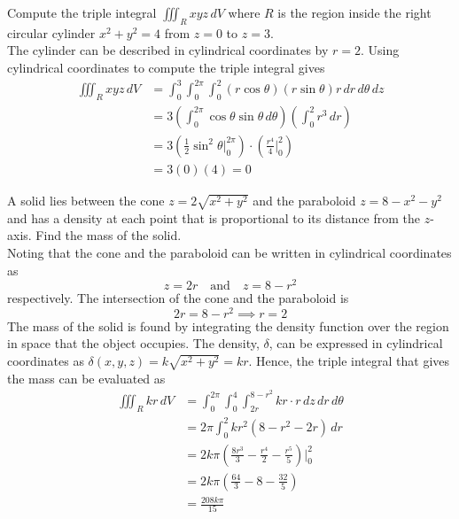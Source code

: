 \documentclass[handout]{ximera}
\begin{document}
\begin{example}[Example 2]
Compute the triple integral $\iiint_R xyz \, dV$ where $R$ is the region inside the right circular cylinder $ x^2 + y^2 = 4$ from $z = 0 $ to $z = 3$.\\
The cylinder can be described in cylindrical coordinates by $r = 2$. Using cylindrical coordinates to compute the triple integral gives
\begin{align*}
\iiint_R xyz \, dV &= \int_0^3 \int_0^{2\pi} \int_0^2 (r\cos \theta)(r\sin\theta) r \, dr\, d\theta\, dz \\
                   &= 3 \left( \int_0^{2\pi} \cos \theta \sin \theta \, d\theta\right) \left( \int_0^2 r^3 \, dr\right)\\
                   &= 3 \left(\frac12 \sin^2 \theta \bigg|_0^{2\pi} \right) \cdot \left( \frac{r^4}{4} \bigg|_0^2 \right)\\
                   &= 3 (0) (4) = 0
\end{align*}
\end{example}


\begin{example}[Example 3]
A solid lies between the cone $z = 2\sqrt{x^2 + y^2}$ and the paraboloid $z = 8 - x^2 - y^2$ and has a 
density at each point that is proportional to its distance from the $z$-axis. Find the mass of the solid.\\

Noting that the cone and the paraboloid can be written in cylindrical coordinates as
\[
 z = 2r \quad \text{and} \quad  z = 8 - r^2
\]
respectively. The intersection of the cone and the paraboloid is
\[
2r = 8 - r^2 \implies r = 2
\]
The mass of the solid is found by integrating the density function over the region in space that the object occupies.
The density, $\delta$, can be expressed in cylindrical coordinates as $\delta(x, y, z) = k \sqrt{x^2+y^2} = kr$.
Hence, the triple integral that gives the mass can be evaluated as
\begin{align*}
\iiint_R kr \, dV &=  \int_0^{2\pi} \int_0^4 \int_{2r}^{8-r^2} kr \cdot r \, dz \, dr \, d\theta \\
                  &= 2\pi \int_0^2 kr^2 (8 - r^2 - 2r) \,dr\\
                  &= 2k\pi \left(\frac{8r^3}{3} - \frac{r^4}{2} - \frac{r^5}{5} \right)\bigg|_0^2 \\
                  &= 2k\pi \left(\frac{64}{3} - 8 - \frac{32}{5}\right)\\
                  &= \frac{208k\pi}{15}
\end{align*}
\end{example}
\end{document}
